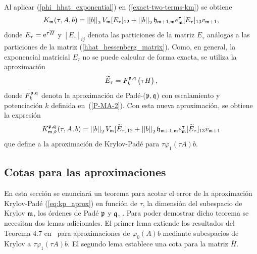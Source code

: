 Al aplicar (\ref{phi_hhat_exponential}) en (\ref{exact-two-terms-km}) se obtiene
\begin{equation*}
    K_{\mathfrak{m}}(\tau,A,b) = \left\lvert \left\lvert  b  \right\rvert \right\rvert_2V_{\mathfrak{m}} [E_\tau]_{12} + \left\lvert \left\lvert  b  \right\rvert \right\rvert_2\mathfrak{h}_{\mathfrak{m}+1,\mathfrak{m}}e^\intercal_{\mathfrak{m}}[E_\tau]_{13}v_{\mathfrak{m}+1}, 
 \end{equation*}
 donde $E_\tau = \mathrm{e}^{\tau \overline{H} }$ y $[E_\tau]_{ij}$ denota las particiones de la matriz $E_\tau$ análogas a las particiones de la matriz (\ref{hhat_hessenberg_matrix}). Como, en general, la exponencial matricial $E_\tau$ no se puede calcular de forma exacta, se utiliza la aproximación
\begin{equation*}
    \widetilde{E}_{\tau} = F_k^{\mathfrak{p},\mathfrak{q}}\left(\tau\overline{H}\right),
\end{equation*}
donde $F_k^{\mathfrak{p},\mathfrak{q}}$ denota la aproximación de Padé-($\mathfrak{p},\mathfrak{q}$) con escalamiento y potenciación $k$ definida en~(\ref{P-MA-2}). Con esta nueva aproximación, se obtiene la expresión 
\begin{equation} \label{eq:kp_aprox}
    K_{\mathfrak{m},k}^{\mathfrak{p},\mathfrak{q}}(\tau,A,b) = \left\lvert \left\lvert  b  \right\rvert \right\rvert_2V_{\mathfrak{m}} [\widetilde{E}_\tau]_{12} + \left\lvert \left\lvert  b  \right\rvert \right\rvert_2\mathfrak{h}_{\mathfrak{m}+1,\mathfrak{m}}e^\intercal_{\mathfrak{m}}[\widetilde{E}_\tau]_{13}v_{\mathfrak{m}+1}
 \end{equation}
 que define a la aproximación de Krylov-Padé para $\tau\varphi_1(\tau A)b$.

 \subsection{Cotas para las aproximaciones}
 En esta sección se enunciará un teorema para acotar el error de la aproximación Krylov-Padé (\ref{eq:kp_aprox}) en función de $\tau$, la dimensión del subespacio de Krylov $\mathfrak{m}$, los órdenes de Padé $\mathfrak{p}$ y $\mathfrak{q}$, . Para poder demostrar dicho teorema se necesitan dos lemas adicionales. El primer lema extiende los resultados del Teorema 4.7 en~\cite{Saad92} para aproximaciones de $\varphi_0(A)b$ mediante subespacios de Krylov a $\tau \varphi_1(\tau A)b$. El segundo lema establece una cota para la matriz $\overline{H}$. 

